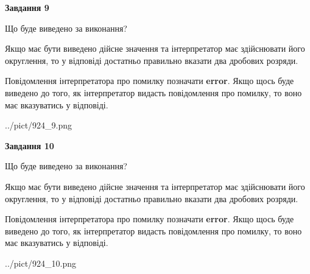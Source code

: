 \documentclass[12pt, ukrainian]{article}
\begin{document}
{\begin {Large}
{\begin {center}\textbf{Завдання 9}\end {center}}\par
Що буде виведено за виконання? \par

Якщо має бути виведено дійсне значення та інтерпретатор має здійснювати його округлення, 
то у відповіді достатньо правильно вказати два дробових розряди.

Повідомлення інтерпретатора про помилку позначати \textbf{error}.
Якщо щось буде виведено до того, як інтерпретатор видасть повідомлення про помилку, 
то воно має вказуватись у відповіді. \par

\begin{center}
	{../pict/924_9.png}
\end{center}
\newpage

{\begin {center}\textbf{Завдання 10}\end {center}}\par
Що буде виведено за виконання? \par

Якщо має бути виведено дійсне значення та інтерпретатор має здійснювати його округлення, 
то у відповіді достатньо правильно вказати два дробових розряди.

Повідомлення інтерпретатора про помилку позначати \textbf{error}.
Якщо щось буде виведено до того, як інтерпретатор видасть повідомлення про помилку, 
то воно має вказуватись у відповіді. \par

\begin{center}
	{../pict/924_10.png}
\end{center}
\newpage

\end {Large}}
\end{document}
